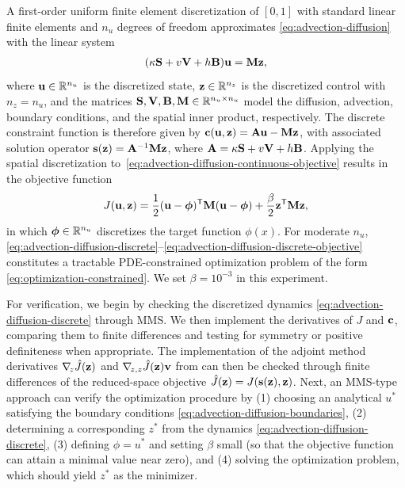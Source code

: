 A first-order uniform finite element discretization of $[0,1]$ with standard linear finite elements and $n_u$ degrees of freedom approximates \cref{eq:advection-diffusion} with the linear system
\begin{align}
    \label{eq:advection-diffusion-discrete}
    (\kappa\mathbf{S} + v\mathbf{V} + h\mathbf{B})\mathbf{u} = \mathbf{M}\mathbf{z},
\end{align}
where $\mathbf{u}\in\mathbb{R}^{n_u}$ is the discretized state, $\mathbf{z}\in\mathbb{R}^{n_z}$ is the discretized control with $n_z = n_u$, and the matrices $\mathbf{S},\mathbf{V},\mathbf{B},\mathbf{M}\in\mathbb{R}^{n_u\times n_u}$ model the diffusion, advection, boundary conditions, and the spatial inner product, respectively.
The discrete constraint function is therefore given by $\mathbf{c}(\mathbf{u},\mathbf{z}) = \mathbf{A}\mathbf{u} - \mathbf{M}\mathbf{z}$, with associated solution operator $\mathbf{s}(\mathbf{z}) = \mathbf{A}^{-1}\mathbf{M}\mathbf{z}$, where $\mathbf{A} = \kappa\mathbf{S} + v\mathbf{V} + h\mathbf{B}$.
Applying the spatial discretization to~\cref{eq:advection-diffusion-continuous-objective} results in the objective function
\begin{align}
    \label{eq:advection-diffusion-discrete-objective}
    J(\mathbf{u}, \mathbf{z})
    = \frac{1}{2}(\mathbf{u} - \boldsymbol{\phi})^{\mathsf{T}}\mathbf{M}(\mathbf{u} - \boldsymbol{\phi})
    + \frac{\beta}{2}\mathbf{z}^{\mathsf{T}}\mathbf{M}\mathbf{z},
\end{align}
in which $\boldsymbol{\phi}\in\mathbb{R}^{n_u}$ discretizes the target function $\phi(x)$.
For moderate $n_u$, \cref{eq:advection-diffusion-discrete}--\cref{eq:advection-diffusion-discrete-objective} constitutes a tractable PDE-constrained optimization problem of the form \cref{eq:optimization-constrained}.
We set $\beta = 10^{-3}$ in this experiment.

For verification, we begin by checking the discretized dynamics \cref{eq:advection-diffusion-discrete} through MMS.
We then implement the derivatives of $J$ and $\mathbf{c}$, comparing them to finite differences and testing for symmetry or positive definiteness when appropriate.
The implementation of the adjoint method derivatives $\nabla_{\!z}\hat{J}(\mathbf{z})$ and $\nabla_{\!z,z}\hat{J}(\mathbf{z})\mathbf{v}$ from  can then be checked through finite differences of the reduced-space objective $\hat{J}(\mathbf{z}) = J(\mathbf{s}(\mathbf{z}),\mathbf{z})$.
Next, an MMS-type approach can verify the optimization procedure by (1) choosing an analytical $u^{*}$ satisfying the boundary conditions \cref{eq:advection-diffusion-boundaries}, (2) determining a corresponding $z^{*}$ from the dynamics \cref{eq:advection-diffusion-discrete}, (3) defining $\phi = u^{*}$ and setting $\beta$ small (so that the objective function can attain a minimal value near zero), and (4) solving the optimization problem, which should yield $z^{*}$ as the minimizer.

